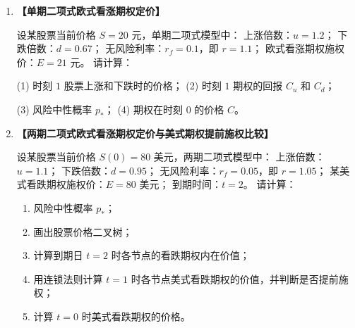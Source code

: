 \documentclass[10pt]{article}
\begin{document}
\begin{enumerate}[label=\textbf{\arabic*.}]
某欧式看涨期权的施权价为 \(E\)，在时刻 \(1\) 的回报分别为：
\(
C_u = \max(uS - E, 0), \quad 
C_d = \max(dS - E, 0). 
\)

请完成以下问题：

\begin{enumerate}[label=(\arabic*)]
    \item 构造一个由 \(\Delta\) 份股票和无风险资产 \(B\) 组成的复制组合，使其在时刻 \(1\) 的价值分别等于 \(C_u\) 和 \(C_d\)，写出方程组；
    \item 解出 \(\Delta\) 和 \(B\) 的表达式；
    \item 利用无套利原理，写出期权在时刻 \(0\) 的价格 \(C\)；
    \item 证明 \(C\) 可以写成如下风险中性定价形式：
    \(\displaystyle 
    C = \frac{1}{r} [p_* C_u + (1 - p_*) C_d],  
    \) 
    并给出 \(p_*\) 的表达式；
    \item 解释为什么 \(p_*\) 被称为风险中性概率，它与股票实际上涨概率 \(q\) 有何区别。
\end{enumerate}

\vspace{0cm}

\item  {\bf{【单期二项式欧式看涨期权定价】}} %

设某股票当前价格 \(S = 20\) 元，单期二项式模型中：
上涨倍数：\(u = 1.2\)；
下跌倍数：\(d = 0.67\)；
无风险利率：\(r_f = 0.1\)，即 \(r = 1.1\)；
欧式看涨期权施权价：\(E = 21\) 元。
请计算：

(1) 时刻 \(1\) 股票上涨和下跌时的价格；\hspace{1cm}
(2) 时刻 \(1\) 期权的回报 \(C_u\) 和 \(C_d\)；

(3) 风险中性概率 \(p_*\)；\hspace{3.4cm}
(4) 期权在时刻 \(0\) 的价格 \(C\)。

\vspace{0cm}

\item  {\bf{【两期二项式欧式看涨期权定价与美式期权提前施权比较】}} %

设某股票当前价格 \(S(0) = 80\) 美元，两期二项式模型中：
上涨倍数：\(u = 1.1\)；
下跌倍数：\(d = 0.95\)；
无风险利率：\(r_f = 0.05\)，即 \(r = 1.05\)；
某美式看跌期权施权价：\(E = 80\) 美元；
到期时间：\(t = 2\)。
请计算：

\begin{enumerate}[label=(\arabic*)]
    \item 风险中性概率 \(p_*\)；
    \item 画出股票价格二叉树；
    \item 计算到期日 \(t = 2\) 时各节点的看跌期权内在价值；
    \item 用连锁法则计算 \(t = 1\) 时各节点美式看跌期权的价值，并判断是否提前施权；
    \item 计算 \(t = 0\) 时美式看跌期权的价格。
\end{enumerate}


\end{enumerate}
\end{document}
